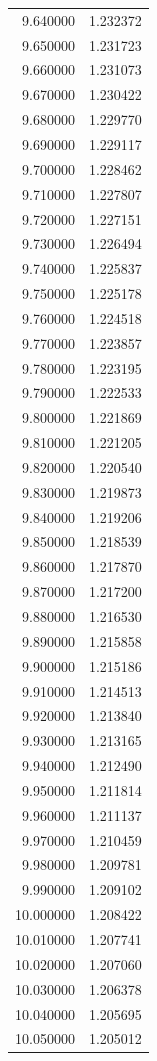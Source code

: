 \begin{tabular}{rr}
9.640000 & 1.232372 \\
9.650000 & 1.231723 \\
9.660000 & 1.231073 \\
9.670000 & 1.230422 \\
9.680000 & 1.229770 \\
9.690000 & 1.229117 \\
9.700000 & 1.228462 \\
9.710000 & 1.227807 \\
9.720000 & 1.227151 \\
9.730000 & 1.226494 \\
9.740000 & 1.225837 \\
9.750000 & 1.225178 \\
9.760000 & 1.224518 \\
9.770000 & 1.223857 \\
9.780000 & 1.223195 \\
9.790000 & 1.222533 \\
9.800000 & 1.221869 \\
9.810000 & 1.221205 \\
9.820000 & 1.220540 \\
9.830000 & 1.219873 \\
9.840000 & 1.219206 \\
9.850000 & 1.218539 \\
9.860000 & 1.217870 \\
9.870000 & 1.217200 \\
9.880000 & 1.216530 \\
9.890000 & 1.215858 \\
9.900000 & 1.215186 \\
9.910000 & 1.214513 \\
9.920000 & 1.213840 \\
9.930000 & 1.213165 \\
9.940000 & 1.212490 \\
9.950000 & 1.211814 \\
9.960000 & 1.211137 \\
9.970000 & 1.210459 \\
9.980000 & 1.209781 \\
9.990000 & 1.209102 \\
10.000000 & 1.208422 \\
10.010000 & 1.207741 \\
10.020000 & 1.207060 \\
10.030000 & 1.206378 \\
10.040000 & 1.205695 \\
10.050000 & 1.205012 \\

\end{tabular}
